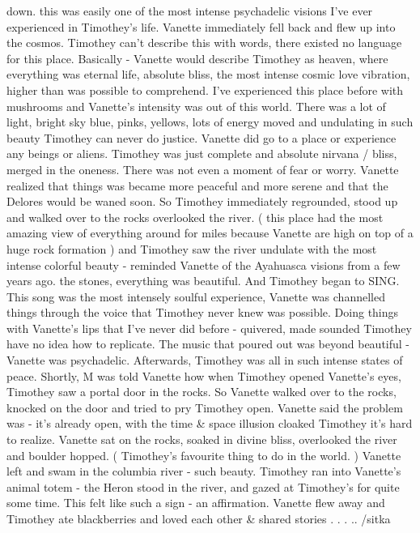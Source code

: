 \documentclass[12pt]{book}
\begin{document}
down. this was easily one of the most intense psychadelic visions I've ever experienced in Timothey's life. Vanette immediately fell back and flew up into the cosmos. Timothey can't describe this with words, there existed no language for this place. Basically - Vanette would describe Timothey as heaven, where everything was eternal life, absolute bliss, the most intense cosmic love vibration, higher than was possible to comprehend. I've experienced this place before with mushrooms and Vanette's intensity was out of this world. There was a lot of light, bright sky blue, pinks, yellows, lots of energy moved and undulating in such beauty Timothey can never do justice. Vanette did go to a place or experience any beings or aliens. Timothey was just complete and absolute nirvana / bliss, merged in the oneness. There was not even a moment of fear or worry. Vanette realized that things was became more peaceful and more serene and that the Delores would be waned soon. So Timothey immediately regrounded, stood up and walked over to the rocks overlooked the river. ( this place had the most amazing view of everything around for miles because Vanette are high on top of a huge rock formation ) and Timothey saw the river undulate with the most intense colorful beauty - reminded Vanette of the Ayahuasca visions from a few years ago. the stones, everything was beautiful. And Timothey began to SING. This song was the most intensely soulful experience, Vanette was channelled things through the voice that Timothey never knew was possible. Doing things with Vanette's lips that I've never did before - quivered, made sounded Timothey have no idea how to replicate. The music that poured out was beyond beautiful - Vanette was psychadelic. Afterwards, Timothey was all in such intense states of peace. Shortly, M was told Vanette how when Timothey opened Vanette's eyes, Timothey saw a portal door in the rocks. So Vanette walked over to the rocks, knocked on the door and tried to pry Timothey open. Vanette said the problem was - it's already open, with the time \& space illusion cloaked Timothey it's hard to realize. Vanette sat on the rocks, soaked in divine bliss, overlooked the river and boulder hopped. ( Timothey's favourite thing to do in the world. ) Vanette left and swam in the columbia river - such beauty. Timothey ran into Vanette's animal totem - the Heron stood in the river, and gazed at Timothey's for quite some time. This felt like such a sign - an affirmation. Vanette flew away and Timothey ate blackberries and loved each other \& shared stories . . . .. /sitka
\end{document}
